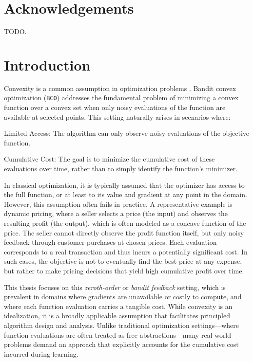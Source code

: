 \documentclass[letter, 12pt]{report}
\newcommand{\1}{\mathbf{1}}
\newcommand{\bco}{\texttt{BCO}\xspace}
\theoremstyle{plain}
\theoremstyle{definition}
\theoremstyle{remark}
\begin{document}
\chapter*{Acknowledgements} 
TODO.

\tableofcontents
\listoftables
\listoffigures
\listofalgorithms {}

\clearpage
\setcounter{page}{1}   %
\renewcommand{\thepage}{\arabic{page}} %
\chapter{Introduction} \label{ch:intro}
Convexity is a common assumption in optimization problems \citep{boyd2004convex}.
Bandit convex optimization (\bco) addresses the fundamental problem of minimizing a convex function over a convex set when only noisy evaluations of the function are available at selected points. This setting naturally arises in scenarios where:

\begin{enumroman}
    \item \textcolor{dkblue}{Limited Access:} The algorithm can only observe noisy evaluations of the objective function.
    \item \textcolor{dkblue}{Cumulative Cost:} The goal is to minimize the cumulative cost of these evaluations over time, rather than to simply identify the function’s minimizer.
\end{enumroman}

In classical optimization, it is typically assumed that the optimizer has access to the full function, or at least to its value and gradient at any point in the domain. However, this assumption often fails in practice. A representative example is dynamic pricing, where a seller selects a price (the input) and observes the resulting profit (the output), which is often modeled as a concave function of the price. The seller cannot directly observe the profit function itself, but only noisy feedback through customer purchases at chosen prices. Each evaluation corresponds to a real transaction and thus incurs a potentially significant cost. In such cases, the objective is not to eventually find the best price at any expense, but rather to make pricing decisions that yield high cumulative profit over time.

This thesis focuses on this \emph{zeroth-order} or \emph{bandit feedback} setting, which is prevalent in domains where gradients are unavailable or costly to compute, and where each function evaluation carries a tangible cost. While convexity is an idealization, it is a broadly applicable assumption that facilitates principled algorithm design and analysis. Unlike traditional optimization settings—where function evaluations are often treated as free abstractions—many real-world problems demand an approach that explicitly accounts for the cumulative cost incurred during learning.
\end{document}
